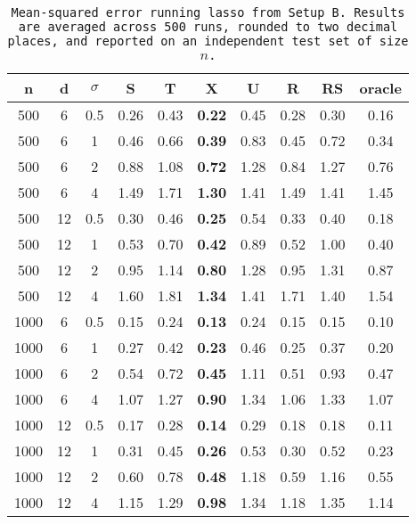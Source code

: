 \begin{table}[ht]
\centering
\begin{tabular}{cccccccccc}
  \hline
n & d & $\sigma$ & S & T & X & U & R & RS & oracle \\ 
  \hline
500 & 6 & 0.5 & 0.26 & 0.43 & \bf 0.22 & 0.45 & 0.28 & 0.30 & 0.16 \\ 
  500 & 6 & 1 & 0.46 & 0.66 & \bf 0.39 & 0.83 & 0.45 & 0.72 & 0.34 \\ 
  500 & 6 & 2 & 0.88 & 1.08 & \bf 0.72 & 1.28 & 0.84 & 1.27 & 0.76 \\ 
  500 & 6 & 4 & 1.49 & 1.71 & \bf 1.30 & 1.41 & 1.49 & 1.41 & 1.45 \\ 
  500 & 12 & 0.5 & 0.30 & 0.46 & \bf 0.25 & 0.54 & 0.33 & 0.40 & 0.18 \\ 
  500 & 12 & 1 & 0.53 & 0.70 & \bf 0.42 & 0.89 & 0.52 & 1.00 & 0.40 \\ 
  500 & 12 & 2 & 0.95 & 1.14 & \bf 0.80 & 1.28 & 0.95 & 1.31 & 0.87 \\ 
  500 & 12 & 4 & 1.60 & 1.81 & \bf 1.34 & 1.41 & 1.71 & 1.40 & 1.54 \\ 
  1000 & 6 & 0.5 & 0.15 & 0.24 & \bf 0.13 & 0.24 & 0.15 & 0.15 & 0.10 \\ 
  1000 & 6 & 1 & 0.27 & 0.42 & \bf 0.23 & 0.46 & 0.25 & 0.37 & 0.20 \\ 
  1000 & 6 & 2 & 0.54 & 0.72 & \bf 0.45 & 1.11 & 0.51 & 0.93 & 0.47 \\ 
  1000 & 6 & 4 & 1.07 & 1.27 & \bf 0.90 & 1.34 & 1.06 & 1.33 & 1.07 \\ 
  1000 & 12 & 0.5 & 0.17 & 0.28 & \bf 0.14 & 0.29 & 0.18 & 0.18 & 0.11 \\ 
  1000 & 12 & 1 & 0.31 & 0.45 & \bf 0.26 & 0.53 & 0.30 & 0.52 & 0.23 \\ 
  1000 & 12 & 2 & 0.60 & 0.78 & \bf 0.48 & 1.18 & 0.59 & 1.16 & 0.55 \\ 
  1000 & 12 & 4 & 1.15 & 1.29 & \bf 0.98 & 1.34 & 1.18 & 1.35 & 1.14 \\ 
   \hline
\end{tabular}
\caption{\tt Mean-squared error running \texttt{lasso} from Setup B. Results are averaged across 500 runs, rounded to two decimal places, and reported on an independent test set of size $n$.} 
\label{table:setup2}
\end{table}
